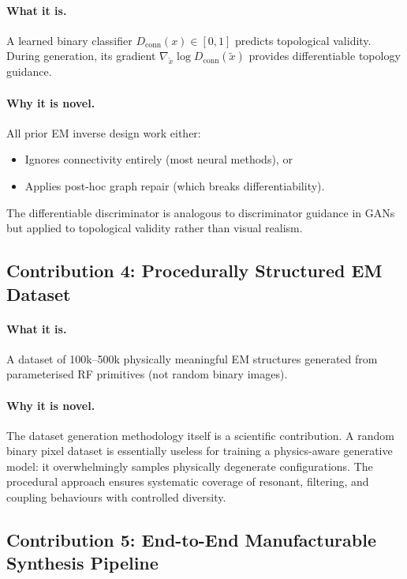 \documentclass[12pt,a4paper]{article}
\newcommand{\xtilde}{\tilde{x}}
\theoremstyle{definition}
\theoremstyle{plain}
\theoremstyle{remark}
\begin{document}
\paragraph{What it is.}
A learned binary classifier $D_{\mathrm{conn}}(x) \in [0,1]$ predicts topological
validity.
During generation, its gradient $\nabla_{\xtilde}\log D_{\mathrm{conn}}(\xtilde)$
provides differentiable topology guidance.

\paragraph{Why it is novel.}
All prior EM inverse design work either:
\begin{itemize}
  \item Ignores connectivity entirely (most neural methods), or
  \item Applies post-hoc graph repair (which breaks differentiability).
\end{itemize}
The differentiable discriminator is analogous to discriminator guidance in GANs but
applied to topological validity rather than visual realism.

\subsection{Contribution 4: Procedurally Structured EM Dataset}

\paragraph{What it is.}
A dataset of 100k--500k physically meaningful EM structures generated from parameterised
RF primitives (not random binary images).

\paragraph{Why it is novel.}
The dataset generation methodology itself is a scientific contribution.
A random binary pixel dataset is essentially useless for training a physics-aware
generative model: it overwhelmingly samples physically degenerate configurations.
The procedural approach ensures systematic coverage of resonant, filtering, and coupling
behaviours with controlled diversity.

\subsection{Contribution 5: End-to-End Manufacturable Synthesis Pipeline}
\end{document}
